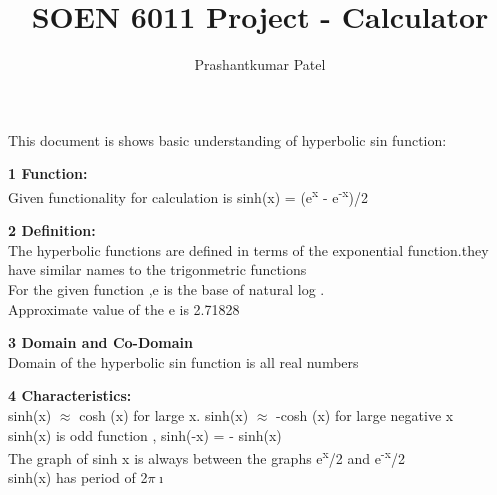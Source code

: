 \documentclass[a4paper,10pt]{article}
\title{SOEN 6011 Project - Calculator}
\author{Prashantkumar Patel}
\begin{document}
\maketitle

{\fontsize{12}{16}\selectfont This document is shows basic understanding of hyperbolic sin function: \\} 

{\Large\textbf{1 Function:}\\}
\newline
\indent\indent
{\fontsize{12}{16}\selectfont Given functionality for calculation is  sinh(x) =   {(e\textsuperscript{x} - e\textsuperscript{-x})}{/2}\\}

{\Large\textbf{2 Definition:}\\}
\newline
\indent\indent
{\fontsize{12}{16}\selectfont The  hyperbolic  functions  are defined
 in terms of the exponential function.they  have similar
\indent\indent names to the trigonmetric functions \\}
\newline
\indent\indent
{\fontsize{12}{16}\selectfont For the given function ,e is the  base of natural log . \\}
\newline
\indent\indent
{\fontsize{12}{16}\selectfont Approximate value of the e is  2.71828\\}


{\Large\textbf{3 Domain and Co-Domain} \\}
\newline
\indent\indent
{\fontsize{12}{16}\selectfont Domain of the hyperbolic sin function is all real numbers  \\}


{\Large\textbf{4 Characteristics:}\\}
\newline
\indent\indent
{\fontsize{12}{16}\selectfont sinh(x) $\approx$ cosh (x) for large x.
sinh(x) $\approx$  -cosh (x) for large negative x \\}
\newline\indent\indent
{\fontsize{12}{16}\selectfont sinh(x) is odd function , sinh(-x) = - sinh(x) \\}
\newline\indent\indent
{\fontsize{12}{16}\selectfont The graph of sinh x
is always between the graphs e\textsuperscript{x}/2  and e\textsuperscript{-x}/2 \\}
\newline\indent\indent
{\fontsize{12}{16}\selectfont sinh(x) has period of 2$\pi$$\imath$\\}
\end{document}

